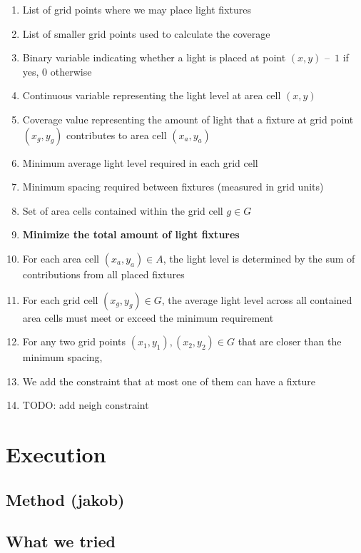 \documentclass{article}
\begin{document}
\begin{enumerate}
    \item List of grid points where we may place light fixtures
    \item List of smaller grid points used to calculate the coverage
    \item Binary variable indicating whether a light is placed at point $(x, y)$ – $1$ if yes, $0$ otherwise
    \item Continuous variable representing the light level at area cell $(x, y)$
    \item Coverage value representing the amount of light that a fixture at grid point $(x_g,y_g)$ contributes to area cell $(x_a,y_a)$
    \item Minimum average light level required in each grid cell
    \item Minimum spacing required between fixtures (measured in grid units)
    \item Set of area cells contained within the grid cell $g \in G$
    \item \textbf{Minimize the total amount of light fixtures}
    \item For each area cell $(x_a,y_a) \in A$, the light level is determined by the sum of contributions from all placed fixtures
    \item For each grid cell $(x_g,y_g) \in G$, the average light level across all contained area cells must meet or exceed the minimum requirement
    \item For any two grid points $(x_1,y_1), (x_2,y_2) \in G$ that are closer than the minimum spacing,
    \item We add the constraint that at most one of them can have a fixture
    \item TODO: add neigh constraint 
\end{enumerate}

\newpage

\section{Execution}
\hrulefill{}
\subsection{Method (jakob)}
\subsection{What we tried}
\end{document}
